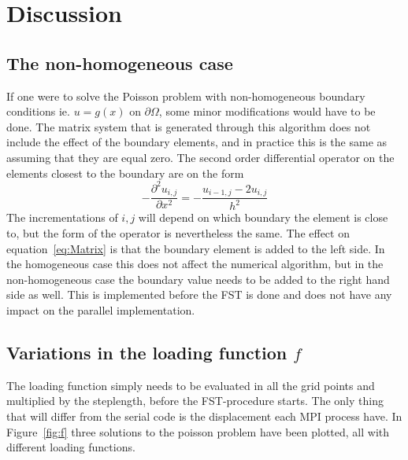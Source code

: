 \section{Discussion}

\subsection{The non-homogeneous case}
If one were to solve the Poisson problem with non-homogeneous boundary conditions ie. $u = g(x) $ on $\partial \Omega$, 
some minor modifications would have to be done. 
The matrix system that is generated through this algorithm does not include the effect of the boundary elements, 
and in practice this is the same as assuming that they are equal zero. The second order differential operator on the elements 
closest to the boundary are on the form 
\begin{equation}
	-\frac{\partial^2 u_{i,j}}{\partial x^2} = -\frac{u_{i-1,j}-2u_{i,j}}{h^2}
\end{equation}
The incrementations of $i,j$ will depend on which boundary the element is close to, but the form of the operator is nevertheless the same.
The effect on equation~\ref{eq:Matrix} is that the boundary element is added to the left side.
In the homogeneous case this does not affect the numerical algorithm, but in the non-homogeneous case the boundary value needs to be added to the 
right hand side as well. This is implemented before the FST is done and does not have any impact on the parallel implementation. 

\subsection{Variations in the loading function $f$}
The loading function simply needs to be evaluated in all the grid points and multiplied by the steplength, before the 
FST-procedure starts. The only thing that will differ from the serial code is the displacement each MPI process have.
In Figure~\ref{fig:f} three solutions to the poisson problem have been plotted, all with different loading functions. 

